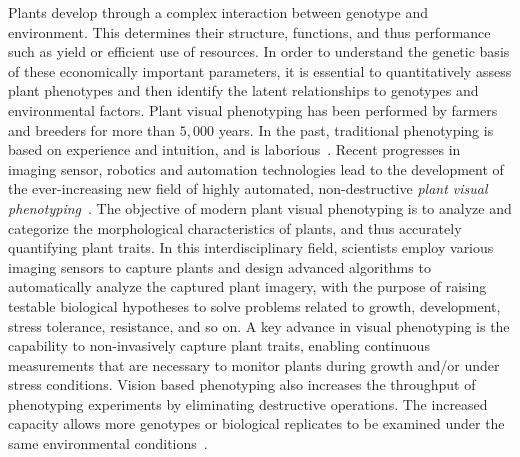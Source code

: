 Plants develop through a complex interaction between genotype and environment.
This determines their structure, functions, and thus performance such as yield or efficient use of resources.
In order to understand the genetic basis of these economically important parameters, it is essential to quantitatively assess plant phenotypes and then identify the latent relationships to genotypes and environmental factors.
%
Plant visual phenotyping has been performed by farmers and breeders for more than $5,000$ years.
In the past, traditional phenotyping is based on experience and intuition, and is laborious~\cite{johannsenerblichkeit}.
Recent progresses in imaging sensor, robotics and automation technologies lead to the development of the ever-increasing new field of highly automated, non-destructive {\it plant visual phenotyping}~\cite{furbank2011phenomics,cruz2015depi}.
%
The objective of modern  plant visual phenotyping is to analyze and categorize the morphological characteristics of plants, and thus accurately quantifying plant traits. %
In this interdisciplinary field, scientists employ various imaging sensors to capture plants and design advanced algorithms to automatically analyze the captured plant imagery, with the purpose of raising testable biological hypotheses to solve problems related to growth, development, stress tolerance, resistance, and so on.
%
%
A key advance in visual phenotyping is the capability to non-invasively capture plant traits, enabling continuous measurements that are necessary to monitor plants during growth and/or under stress conditions. Vision based phenotyping also increases the throughput of phenotyping experiments by eliminating destructive operations.
The increased capacity allows more genotypes or biological replicates to be examined under the same environmental conditions~\cite{fahlgren2015lights,walter2015plant}.

